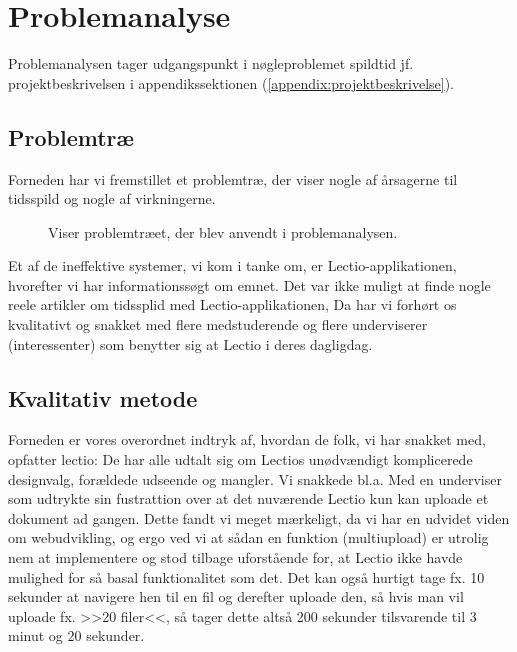 \section{Problemanalyse \label{sec:problemanalyse}}
Problemanalysen tager udgangspunkt i nøgleproblemet spildtid jf. projektbeskrivelsen i appendikssektionen (\ref{appendix:projektbeskrivelse}). 


\subsection{Problemtræ}
Forneden har vi fremstillet et problemtræ, der viser nogle af årsagerne til tidsspild og nogle af virkningerne.
\begin{figure}[H]
    \centering
    \caption{Viser problemtræet, der blev anvendt i problemanalysen.}
\end{figure}
Et af de ineffektive systemer, vi kom i tanke om, er Lectio-applikationen, hvorefter vi har informationssøgt om emnet. Det var ikke muligt at finde nogle reele artikler om tidssplid med Lectio-applikationen, 
Da har vi forhørt os kvalitativt og snakket med flere medstuderende og flere underviserer (interessenter) som benytter sig at Lectio i deres dagligdag.
\subsection{Kvalitativ metode}
Forneden er vores overordnet indtryk af, hvordan de folk, vi har snakket med, opfatter lectio:
De har alle udtalt sig om Lectios unødvændigt komplicerede designvalg, forældede udseende og mangler. Vi snakkede bl.a. Med en underviser som udtrykte sin fustrattion over 
at det nuværende Lectio kun kan uploade et dokument ad gangen. Dette fandt vi meget mærkeligt, da vi har en udvidet viden om webudvikling, og ergo ved vi at sådan en funktion (multiupload) er utrolig nem at 
implementere og stod tilbage uforstående for, at Lectio ikke havde mulighed for så basal funktionalitet som det. Det kan også hurtigt tage fx. 10 sekunder at navigere hen til en fil og derefter uploade den, så hvis man vil uploade fx. >>20 filer<<, så tager dette altså 200 sekunder tilsvarende til 3 minut og 20 sekunder. 

